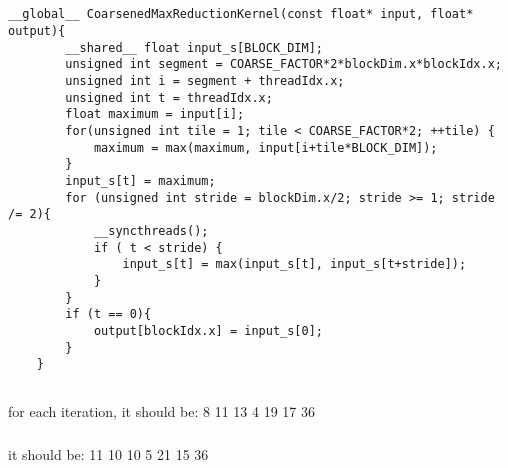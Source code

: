 \documentclass{article}
\begin{document}
\subsection{}
\begin{lstlisting}[basicstyle=\small\ttfamily, breaklines=true]
    __global__ CoarsenedMaxReductionKernel(const float* input, float* output){
        __shared__ float input_s[BLOCK_DIM];
        unsigned int segment = COARSE_FACTOR*2*blockDim.x*blockIdx.x;
        unsigned int i = segment + threadIdx.x;
        unsigned int t = threadIdx.x;
        float maximum = input[i];
        for(unsigned int tile = 1; tile < COARSE_FACTOR*2; ++tile) {
            maximum = max(maximum, input[i+tile*BLOCK_DIM]);
        }
        input_s[t] = maximum;
        for (unsigned int stride = blockDim.x/2; stride >= 1; stride /= 2){
            __syncthreads();
            if ( t < stride) {
                input_s[t] = max(input_s[t], input_s[t+stride]);
            }
        }
        if (t == 0){
            output[blockIdx.x] = input_s[0];
        }
    }
\end{lstlisting}

\subsection{}
\subsubsection{}
for each iteration, it should be:
8 11 13 4
19 17
36

\subsubsection{}
it should be:
11 10 10 5
21 15
36
\end{document}
